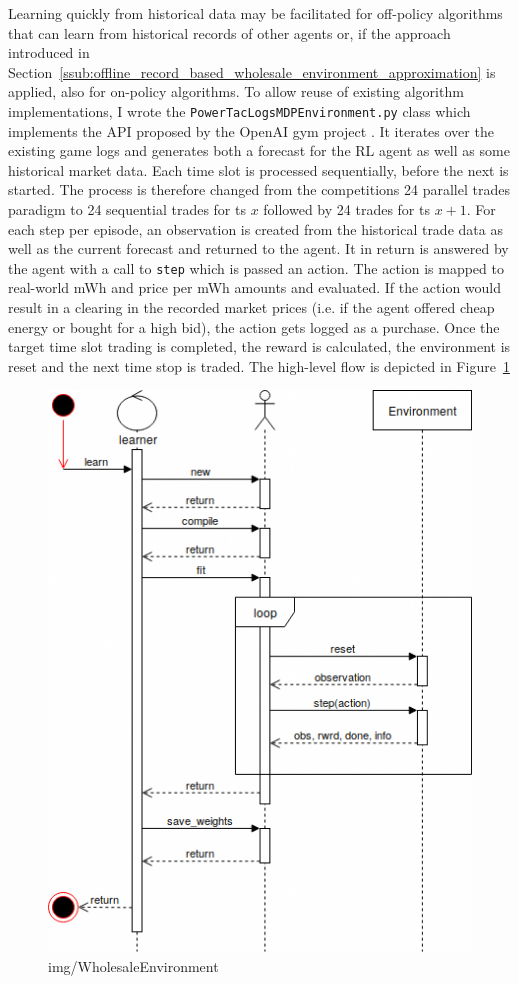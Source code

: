 Learning quickly from historical data may be facilitated for off-policy algorithms that can learn from historical
records of other agents or, if the approach introduced in
Section~\ref{ssub:offline_record_based_wholesale_environment_approximation} is applied, also for on-policy algorithms.
To allow reuse of existing algorithm implementations, I wrote the \texttt{PowerTacLogsMDPEnvironment.py} class which
implements the \ac{API} proposed by the OpenAI gym project \cite[]{brockman2016openai}. It iterates over the existing
game logs and generates both a forecast for the \ac{RL} agent as well as some historical market data. Each time slot is
processed sequentially, before the next is started. The process is therefore changed from the competitions 24 parallel
trades paradigm to 24 sequential trades for ts $x$ followed by 24 trades for ts $x+1$. For each step per episode, an
observation is created from the historical trade data as well as the current forecast and returned to the agent. It
in return is answered by the agent with a call to \texttt{step} which is passed an action. The action is mapped to
real-world \ac{mWh} and price per \ac{mWh} amounts and evaluated. If the action would result in a clearing in the
recorded market prices (i.e. if the agent offered cheap energy or bought for a high bid), the action gets logged as a
purchase. Once the target time slot trading is completed, the reward is calculated, the environment is reset and the
next time stop is traded. The high-level flow is depicted in Figure~\ref{fig:img/WholesaleEnvironment}

\begin{figure}[]
    \centering
    \includegraphics[width=0.6\linewidth]{img/WholesaleEnvironment.png}
    \caption{img/WholesaleEnvironment}
    \label{fig:img/WholesaleEnvironment}
\end{figure}




